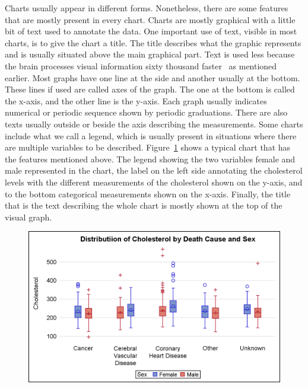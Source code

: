 \documentclass[12pt, a4paper,oneside]{report}
\begin{document}
Charts usually appear in different forms. Nonetheless, there are some features that are mostly present in every chart. Charts are mostly graphical with a little bit of text used to annotate the data. One important use of text, visible in most charts, is to give the chart a title. The title describes what the graphic represents and is usually situated above the main graphical part. Text is used less because the brain processes visual information sixty thousand faster~\cite{humaneye} as mentioned earlier. Most graphs have one line at the side and another usually at the bottom. These lines if used are called axes of the graph. The one at the bottom is called the x-axis, and the other line is the y-axis. Each graph usually indicates numerical or periodic sequence shown by periodic graduations. There are also texts usually outside or beside the axis describing the measurements.
Some charts include what we call a legend, which is usually present in situations where there are multiple variables to be described. Figure~\ref{fig:boxy} shows a typical chart that has the features mentioned above. The legend showing the two variables female and male represented in the chart, the label on the left side annotating the cholesterol levels with the different measurements of the cholesterol shown on the y-axis, and to the bottom categorical measurements shown on the x-axis. Finally, the title that is the text describing the whole chart is mostly shown at the top of the visual graph. 

\begin{figure}[!htb]
	\centering
	\includegraphics [scale=1.0] {box_color.png}
	\label{fig:boxy}
\end{figure}
\end{document}
